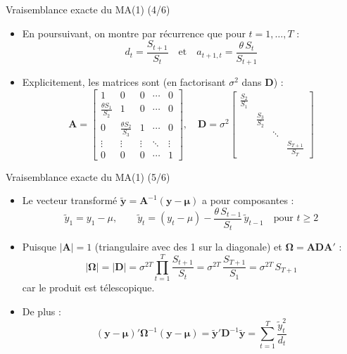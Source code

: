 \documentclass[11pt,aspectratio=169]{beamer}
\begin{document}
\begin{frame}{Vraisemblance exacte du MA(1) (4/6)}

\begin{itemize}

\item En poursuivant, on montre par récurrence que pour $t = 1, \ldots, T$ :
  \[
  \boxed{d_t = \frac{S_{t+1}}{S_t}} \quad \text{et} \quad \boxed{a_{t+1,t} = \frac{\theta \, S_t}{S_{t+1}}}
  \]\newline

\item Explicitement, les matrices sont (en factorisant $\sigma^2$ dans $\mathbf{D}$) :
  \[
  \mathbf{A} = \begin{bmatrix} 1 & 0 & 0 & \cdots & 0 \\[3pt] \frac{\theta S_1}{S_2} & 1 & 0 & \cdots & 0 \\[3pt] 0 & \frac{\theta S_2}{S_3} & 1 & \cdots & 0 \\[3pt] \vdots & \vdots & \vdots & \ddots & \vdots \\[3pt] 0 & 0 & 0 & \cdots & 1 \end{bmatrix}, \quad \mathbf{D} = \sigma^2 \begin{bmatrix} \frac{S_2}{S_1} & & \\[3pt] & \frac{S_3}{S_2} & \\[3pt] & & \ddots \\[3pt] & & & \frac{S_{T+1}}{S_T} \end{bmatrix}
  \]

\end{itemize}

\end{frame}

\begin{frame}{Vraisemblance exacte du MA(1) (5/6)}

\begin{itemize}

\item Le vecteur transformé $\tilde{\mathbf{y}} = \mathbf{A}^{-1}(\mathbf{y} - \bm{\mu})$ a pour composantes :
  \[
  \tilde{y}_1 = y_1 - \mu, \qquad \tilde{y}_t = (y_t - \mu) - \frac{\theta \, S_{t-1}}{S_t}\,\tilde{y}_{t-1} \quad \text{pour } t \geq 2
  \]\newline

\item Puisque $|\mathbf{A}| = 1$ (triangulaire avec des 1 sur la diagonale) et $\bm{\Omega} = \mathbf{A}\mathbf{D}\mathbf{A}'$ :
  \[
  |\bm{\Omega}| = |\mathbf{D}| = \sigma^{2T} \prod_{t=1}^{T} \frac{S_{t+1}}{S_t} = \sigma^{2T}\, \frac{S_{T+1}}{S_1} = \sigma^{2T}\, S_{T+1}
  \]
  car le produit est télescopique.\newline

\item De plus :
  \[
  (\mathbf{y} - \bm{\mu})'\bm{\Omega}^{-1}(\mathbf{y} - \bm{\mu}) = \tilde{\mathbf{y}}'\mathbf{D}^{-1}\tilde{\mathbf{y}} = \sum_{t=1}^{T} \frac{\tilde{y}_t^2}{d_t}
  \]

\end{itemize}

\end{frame}
\end{document}
